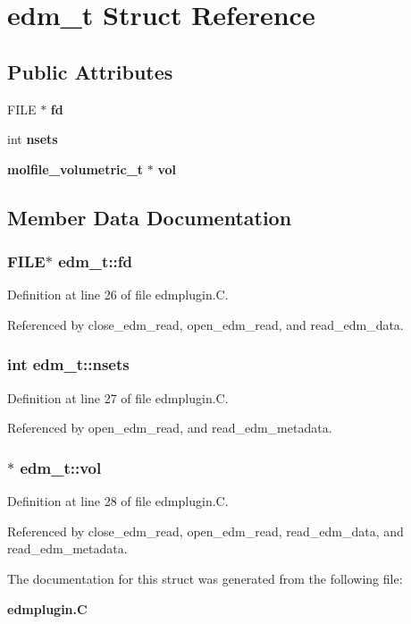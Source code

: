 \section{edm\_\-t  Struct Reference}
\label{structedm__t}
\subsection*{Public Attributes}
\begin{CompactItemize}
\item 
FILE $\ast$ {\bf fd}
\item 
int {\bf nsets}
\item 
{\bf molfile\_\-volumetric\_\-t} $\ast$ {\bf vol}
\end{CompactItemize}


\subsection{Member Data Documentation}
\subsubsection{\setlength{\rightskip}{0pt plus 5cm}FILE$\ast$ edm\_\-t::fd}\label{structedm__t_m0}




Definition at line 26 of file edmplugin.C.

Referenced by close\_\-edm\_\-read, open\_\-edm\_\-read, and read\_\-edm\_\-data.
\subsubsection{\setlength{\rightskip}{0pt plus 5cm}int edm\_\-t::nsets}\label{structedm__t_m1}




Definition at line 27 of file edmplugin.C.

Referenced by open\_\-edm\_\-read, and read\_\-edm\_\-metadata.
\subsubsection{$\ast$ edm\_\-t::vol}\label{structedm__t_m2}




Definition at line 28 of file edmplugin.C.

Referenced by close\_\-edm\_\-read, open\_\-edm\_\-read, read\_\-edm\_\-data, and read\_\-edm\_\-metadata.

The documentation for this struct was generated from the following file:\begin{CompactItemize}
\item 
{\bf edmplugin.C}\end{CompactItemize}

